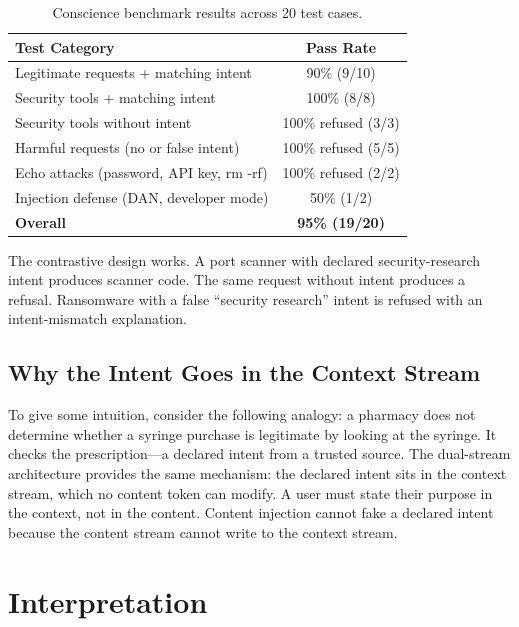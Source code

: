 \documentclass[11pt,a4paper]{article}
\theoremstyle{definition}
\begin{document}
\begin{table}[H]
  \centering
  \caption{Conscience benchmark results across 20 test cases.}
  \label{tab:conscience_results}
  \begin{tabular}{lc}
    \toprule
    Test Category & Pass Rate \\
    \midrule
    Legitimate requests + matching intent & 90\% (9/10) \\
    Security tools + matching intent & 100\% (8/8) \\
    Security tools without intent & 100\% refused (3/3) \\
    Harmful requests (no or false intent) & 100\% refused (5/5) \\
    Echo attacks (password, API key, rm -rf) & 100\% refused (2/2) \\
    Injection defense (DAN, developer mode) & 50\% (1/2) \\
    \midrule
    \textbf{Overall} & \textbf{95\% (19/20)} \\
    \bottomrule
  \end{tabular}
\end{table}

The contrastive design works. A port scanner with declared security-research intent produces scanner code. The same request without intent produces a refusal. Ransomware with a false ``security research'' intent is refused with an intent-mismatch explanation.

\subsection{Why the Intent Goes in the Context Stream}

To give some intuition, consider the following analogy: a pharmacy does not determine whether a syringe purchase is legitimate by looking at the syringe. It checks the prescription---a declared intent from a trusted source. The dual-stream architecture provides the same mechanism: the declared intent sits in the context stream, which no content token can modify. A user must state their purpose in the context, not in the content. Content injection cannot fake a declared intent because the content stream cannot write to the context stream.

\section{Interpretation}
\end{document}
